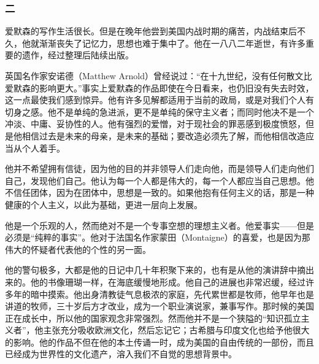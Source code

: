 \subsubsection*{二}
\par 爱默森的写作生活很长。但是在晚年他尝到美国内战时期的痛苦，内战结束后不久，他就渐渐丧失了记忆力，思想也难于集中了。他在一八八二年逝世，有许多重要的遗作，经过整理后陆续出版。
\par 英国名作家安诺德（Matthew Arnold）曾经说过：“在十九世纪，没有任何散文比爱默森的影响更大。”事实上爱默森的作品即使在今日看来，也仍旧没有失去时效，这一点最使我们感到惊异。他有许多见解都适用于当前的政局，或是对我们个人有切身之感。他不是单纯的急进派，更不是单纯的保守主义者；而同时他决不是一个冲淡、中庸、妥协性的人。他有强烈的爱憎，对于现社会的罪恶感到极度愤怒，但是他相信过去是未来的母亲，是未来的基础；要改造必须先了解，而他相信改造应当从个人着手。
\par 他并不希望拥有信徒，因为他的目的并非领导人们走向他，而是领导人们走向他们自己，发现他们自己。他认为每一个人都是伟大的，每一个人都应当自己思想。他不信任团体，因为在团体中，思想是一致的。如果他抱有任何主义的话，那是一种健康的个人主义，以此为基础，更进一层向上发展。
\par 他是一个乐观的人，然而绝对不是一个专事空想的理想主义者。他爱事实——但是必须是“纯粹的事实”。他对于法国名作家蒙田（Montaigne）的喜爱，也是因为那伟大的怀疑者代表他的个性的另一面。
\par 他的警句极多，大都是他的日记中几十年积聚下来的，也有是从他的演讲辞中摘出来的。他的书像珊瑚一样，在海底缓慢地形成。他自己的进展也非常迟缓，经过许多年的暗中摸索。他出身清教徒气息极浓的家庭，先代累世都是牧师，他早年也是讲道的牧师，三十岁后方才改业，成为一个职业演说家，兼事写作。那时候的美国正在成长中，所以他的国家观念非常强烈。然而他并不是一个狭隘的“知识孤立主义者”，他主张充分吸收欧洲文化，然后忘记它；古希腊与印度文化也给予他很大的影响。他的作品不但在他的本土传诵一时，成为美国的自由传统的一部份，而且已经成为世界性的文化遗产，溶入我们不自觉的思想背景中。
